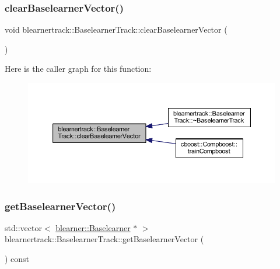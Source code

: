 \subsubsection{\texorpdfstring{clear\+Baselearner\+Vector()}{clearBaselearnerVector()}}
{\footnotesize\ttfamily void blearnertrack\+::\+Baselearner\+Track\+::clear\+Baselearner\+Vector (\begin{DoxyParamCaption}{ }\end{DoxyParamCaption})}

Here is the caller graph for this function\+:\nopagebreak
\begin{figure}[H]
\begin{center}
\leavevmode
\includegraphics[width=350pt]{classblearnertrack_1_1_baselearner_track_aa178f9d817a01240b6f39075f1f445f2_icgraph}
\end{center}
\end{figure}
\mbox{\label{classblearnertrack_1_1_baselearner_track_a596429982bd5fb1c8ffabc5f93849235}} 
\subsubsection{\texorpdfstring{get\+Baselearner\+Vector()}{getBaselearnerVector()}}
{\footnotesize\ttfamily std\+::vector$<$ \mbox{\hyperlink{classblearner_1_1_baselearner}{blearner\+::\+Baselearner}} $\ast$ $>$ blearnertrack\+::\+Baselearner\+Track\+::get\+Baselearner\+Vector (\begin{DoxyParamCaption}{ }\end{DoxyParamCaption}) const}

